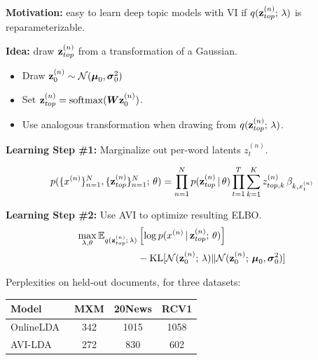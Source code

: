 \begin{frame}
\textbf{Motivation:} easy to learn deep topic models with VI if $q(\mathbf{z}^{(n)}_{top} ; \, \lambda)$ is reparameterizable.

\air
\air
\air
\textbf{Idea:} draw $\mathbf{z}^{(n)}_{top}$ from a transformation of a Gaussian.
\begin{itemize}
    \item Draw $\mathbf{z}^{(n)}_0 \sim \mathcal{N}(\boldsymbol{\mu}_0, \boldsymbol{\sigma}^2_0)$
    \item Set $\mathbf{z}^{(n)}_{top} = \operatorname*{softmax}(\boldsymbol{W} \mathbf{z}^{(n)}_0)$. %
    \item Use analogous transformation when drawing from $q(\mathbf{z}^{(n)}_{top} ; \, \lambda)$.
    
\end{itemize}
    
\end{frame}


\begin{frame}
\textbf{Learning Step \#1:} Marginalize out per-word latents $z^{(n)}_t$. 

\begin{align*}
    p(\{x^{(n)}\}_{n=1}^N, \{\mathbf{z}^{(n)}_{top}\}_{n=1}^N ; \, \theta) = \prod_{n=1}^N p(\mathbf{z}^{(n)}_{top} \,|\, \theta) \prod_{t=1}^T \sum_{k=1}^K z^{(n)}_{top, k} \, \beta_{k, x^{(n)}_t}
\end{align*}

\air
\air
\textbf{Learning Step \#2:} Use AVI to optimize resulting ELBO.
\begin{align*}
    \max_{\lambda, \theta} \mathbb{E}_{q(\mathbf{z}^{(n)}_{top} ; \, \lambda)} &\left[\log p(x^{(n)} \,|\, \mathbf{z}^{(n)}_{top}  ; \, \theta) \right] \\
    &- \operatorname*{KL}[ \mathcal{N}(\mathbf{z}^{(n)}_0 ; \, \lambda) \Vert \mathcal{N}(\mathbf{z}^{(n)}_0 ; \, \boldsymbol{\mu}_0, \boldsymbol{\sigma}_0^2)]
\end{align*}
\end{frame}


\begin{frame}
Perplexities on held-out documents, for three datasets:

\begin{table}
\begin{tabular}{lccc}
\toprule
     Model & MXM & 20News & RCV1 \\
\midrule     
     OnlineLDA~\citep{hoffman2010online} & 342 & 1015 & 1058 \\
     AVI-LDA~\citep{miao2017nvi} & 272 & 830 & 602 \\
\bottomrule
\end{tabular}
\end{table}




\end{frame}